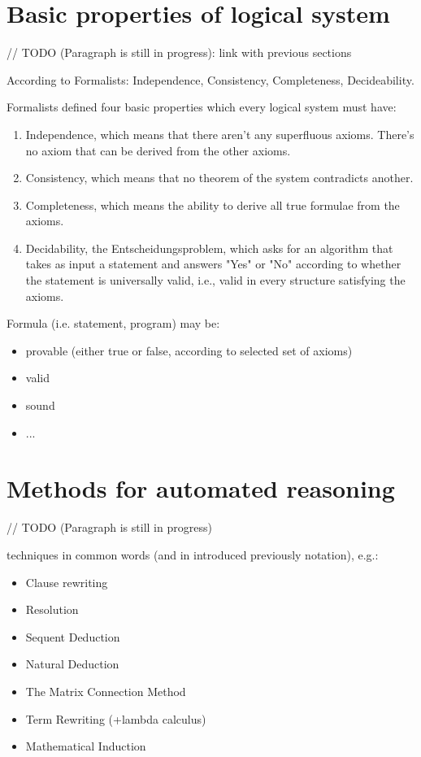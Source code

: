\documentclass[article]{aaltoseries}
\begin{document}

\section{Basic properties of logical system}
\label{sec:logic_properties}

// TODO (Paragraph is still in progress): link with previous sections

According to Formalists: Independence, Consistency, Completeness, Decideability.

Formalists defined four basic properties which every logical system must have:
\begin{enumerate}
\itemsep0em
	\item Independence, which means that there aren’t any superfluous axioms. There’s no axiom that can be derived from the other axioms.
	\item Consistency, which means that no theorem of the system contradicts another.
	\item Completeness, which means the ability to derive all true formulae from the axioms.
	\item Decidability, the Entscheidungsproblem, which asks for an algorithm that takes as input a statement and answers "Yes" or "No" according to whether the statement is universally valid, i.e., valid in every structure satisfying the axioms.
\end{enumerate}

Formula (i.e. statement, program) may be:
\begin{itemize}
\itemsep0em
	\item provable (either true or false, according to selected set of axioms)
	\item valid
	\item sound
	\item ...
\end{itemize}


\section{Methods for automated reasoning}
\label{sec:auto_reasoning}

// TODO (Paragraph is still in progress)

techniques in common words (and in introduced previously notation), e.g.: 
\begin{itemize}
\itemsep0em
	\item Clause rewriting
	\item Resolution
	\item Sequent Deduction
	\item Natural Deduction
	\item The Matrix Connection Method
	\item Term Rewriting (+lambda calculus)
	\item Mathematical Induction
\end{itemize}
\end{document}
